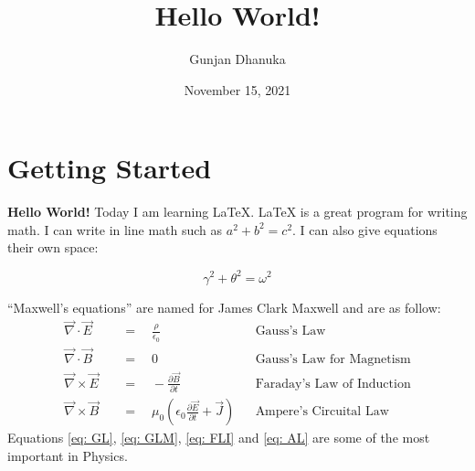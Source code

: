 \documentclass{article}
\title{Hello World!}
\author{Gunjan Dhanuka}
\date{November 15, 2021}
\begin{document}
    \maketitle %
    \thispagestyle{empty}
    \section{Getting Started}
    
        \textbf{Hello World!} Today I am learning \LaTeX. \LaTeX{} is a great program
        for writing math. I can write in line math such as $a^2 + b^2 = c^2$. I can also give
        equations their own space:
        
        \begin{equation}
        \gamma^2+\theta^2=\omega^2
        \end{equation}

        ``Maxwell's equations'' are named for James Clark Maxwell and are as follow:
        \begin{align} %
            \vec{\nabla} \cdot \vec{E} \quad&=
            \quad\frac{\rho}{\epsilon_0}&&\text{Gauss's Law}\label{eq: GL}\\
            \vec{\nabla} \cdot \vec{B} \quad&=
            \quad0&&\text{Gauss's Law for Magnetism}\label{eq: GLM}\\
            \vec{\nabla} \times \vec{E} \quad&= 
            \quad-\frac{\partial\vec{B}}{\partial t}&&\text{Faraday's Law of Induction}\label{eq: FLI}\\
            \vec{\nabla} \times \vec{B} \quad&=
            \quad \mu_0\left(\epsilon_0\frac{\partial\vec{E}}{\partial t}+\vec{J}\right)&&\text{Ampere's Circuital Law}\label{eq: AL}
        \end{align}
        Equations \ref{eq: GL}, \ref{eq: GLM}, \ref{eq: FLI} and \ref{eq: AL} are some of the most important in Physics.
    
\end{document}

